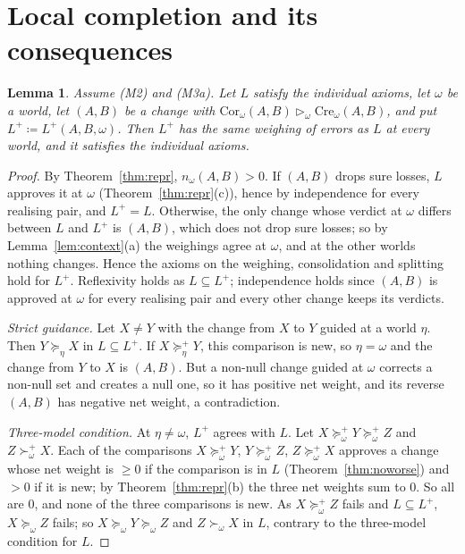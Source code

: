 \documentclass[11pt]{article}
\newtheorem{lemma}[theorem]{Lemma}
\theoremstyle{definition}
\newcommand{\Cor}{\mathrm{Cor}}
\newcommand{\Cre}{\mathrm{Cre}}
\newcommand{\sgt}{\triangleright}
\begin{document}
\begingroup\color{red}
\section{Local completion and its consequences}\label{sec:local}

\begin{lemma}\label{lem:extension}
Assume (M2) and (M3a). Let $L$ satisfy the individual axioms, let $\omega$ be a world, let $(A,B)$ be a change with $\Cor_\omega(A,B)\sgt_\omega\Cre_\omega(A,B)$, and put $L^+\coloneqq L^+(A,B,\omega)$. Then $L^+$ has the same weighing of errors as $L$ at every world, and it satisfies the individual axioms.
\end{lemma}
\begin{proof}
By Theorem~\ref{thm:repr}, $n_\omega(A,B)>0$. If $(A,B)$ drops sure losses, $L$ approves it at $\omega$ (Theorem~\ref{thm:repr}(c)), hence by independence for every realising pair, and $L^+=L$. Otherwise, the only change whose verdict at $\omega$ differs between $L$ and $L^+$ is $(A,B)$, which does not drop sure losses; so by Lemma~\ref{lem:context}(a) the weighings agree at $\omega$, and at the other worlds nothing changes. Hence the axioms on the weighing, consolidation and splitting hold for $L^+$. Reflexivity holds as $L\subseteq L^+$; independence holds since $(A,B)$ is approved at $\omega$ for every realising pair and every other change keeps its verdicts.

\emph{Strict guidance.} Let $X\ne Y$ with the change from $X$ to $Y$ guided at a world $\eta$. Then $Y\succeq_\eta X$ in $L\subseteq L^+$. If $X\succeq^+_\eta Y$, this comparison is new, so $\eta=\omega$ and the change from $Y$ to $X$ is $(A,B)$. But a non-null change guided at $\omega$ corrects a non-null set and creates a null one, so it has positive net weight, and its reverse $(A,B)$ has negative net weight, a contradiction.

\emph{Three-model condition.} At $\eta\ne\omega$, $L^+$ agrees with $L$. Let $X\succeq^+_\omega Y\succeq^+_\omega Z$ and $Z\succ^+_\omega X$. Each of the comparisons $X\succeq^+_\omega Y$, $Y\succeq^+_\omega Z$, $Z\succeq^+_\omega X$ approves a change whose net weight is $\ge0$ if the comparison is in $L$ (Theorem~\ref{thm:noworse}) and $>0$ if it is new; by Theorem~\ref{thm:repr}(b) the three net weights sum to $0$. So all are $0$, and none of the three comparisons is new. As $X\succeq^+_\omega Z$ fails and $L\subseteq L^+$, $X\succeq_\omega Z$ fails; so $X\succeq_\omega Y\succeq_\omega Z$ and $Z\succ_\omega X$ in $L$, contrary to the three-model condition for $L$.
\end{proof}
\end{document}
